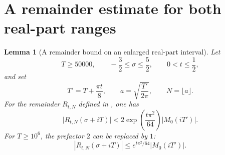 \documentclass[11pt]{article}
\newtheorem{lemma}[theorem]{Lemma}
\theoremstyle{remark}
\numberwithin{equation}{section}
\begin{document}
\section{A remainder estimate for both real-part ranges}\label{sec:remainder}


\begin{lemma}[A remainder bound on an enlarged real-part interval]
\label{lem:remainder}
Let
\[
 T\ge 50000,\qquad -\frac32\le\sigma\le\frac52,
 \qquad 0<t\le\frac12,
\]
and set
\[
 T'=T+\frac{\pi t}{8},\qquad
 a=\sqrt{\frac{T'}{2\pi}},\qquad N=\lfloor a\rfloor.
\]
For the remainder $R_{t,N}$ defined in \cite[equations (38)--(41)]{polymath},
one has
\begin{equation}
 \label{eq:remainder-expanded-domain}
 \bigl|R_{t,N}(\sigma+iT)\bigr|
 <2\exp\!\left(\frac{t\pi^2}{64}\right)|M_0(iT')|.
\end{equation}
For $T\ge10^6$, the prefactor $2$ can be replaced by $1$:
\begin{equation}\label{eq:remainder-high}
 |R_{t,N}(\sigma+iT)|\le e^{t\pi^2/64}|M_0(iT')|.
\end{equation}
\end{lemma}
\end{document}
